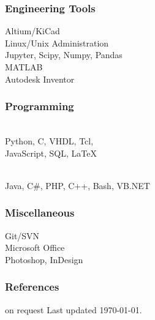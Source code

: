 \begin{facts}
    \subsubsection{Engineering Tools}
    Altium/KiCad\\
    Linux/Unix Administration\\
    Jupyter, Scipy, Numpy, Pandas\\
    MATLAB\\
    Autodesk Inventor
    \sectionsep
    
    \subsubsection{Programming}
    \\
    Python, C, VHDL, Tcl,\\
    JavaScript, SQL, LaTeX
    \sectionsep
    
    \\
    Java, C\#, PHP, C++, Bash, VB.NET
    \sectionsep
    
    \subsubsection{Miscellaneous}
    Git/SVN\\
    Microsoft Office\\
    Photoshop, InDesign
    \sectionsep
    
    \subsubsection{References}
    on request
    \vfill
    Last updated \today.
    
    \end{facts}%
